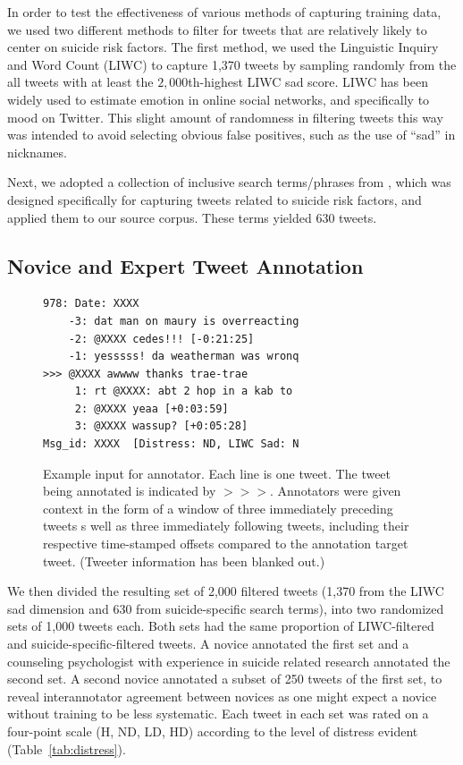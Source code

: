 \documentclass[11pt]{article}
\begin{document}
In order to test the effectiveness of various methods of capturing training data, we used two different methods to filter for tweets that are relatively likely to center on suicide risk factors. The first method, we used the Linguistic Inquiry and Word Count (LIWC) to capture 1,370 tweets by sampling randomly from the all tweets with at least the $2,000$th-highest LIWC sad score. LIWC has been widely used to estimate emotion in online social networks, and specifically to  mood on Twitter. This slight amount of randomness in filtering tweets this way was intended to avoid selecting obvious false positives, such as the use of ``sad'' in nicknames.

Next, we adopted a collection of inclusive search terms/phrases from \cite{Jay}, which was designed specifically for capturing tweets related to suicide risk factors, and applied them to our source corpus. These terms yielded 630 tweets.


\subsection{Novice and Expert Tweet Annotation}
\begin{figure}[h]
  \centering
{\small
\begin{verbatim}
978: Date: XXXX 
    -3: dat man on maury is overreacting
    -2: @XXXX cedes!!! [-0:21:25]
    -1: yesssss! da weatherman was wronq
>>> @XXXX awwww thanks trae-trae
     1: rt @XXXX: abt 2 hop in a kab to 
     2: @XXXX yeaa [+0:03:59]
     3: @XXXX wassup? [+0:05:28]
Msg_id: XXXX  [Distress: ND, LIWC Sad: N
\end{verbatim}}
  \caption{Example input for annotator. Each line is one tweet. The tweet being annotated is indicated by $>>>$. Annotators were given context in the form of a window of three immediately preceding tweets s well as three immediately following tweets, including their respective time-stamped offsets compared to the annotation target tweet. 
(Tweeter information has been blanked out.)}
  \label{fig:annotateeg}
\end{figure}

We then divided the resulting set of 2,000 filtered tweets (1,370 from the LIWC sad dimension and 630 from suicide-specific search terms), into two randomized sets of 1,000 tweets each. Both sets had the same proportion of LIWC-filtered and suicide-specific-filtered tweets. A novice annotated the first set and a counseling psychologist with experience in suicide related research annotated the second set. A second novice annotated a subset of 250 tweets of the first set, to reveal interannotator agreement between novices as one might expect a novice without training to be less systematic. Each tweet in each set was rated on a four-point scale (H, ND, LD, HD) according to the level of distress evident (Table~\ref{tab:distress}).
\end{document}
